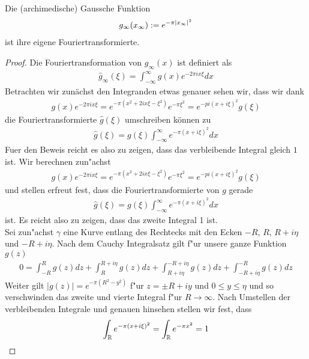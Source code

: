 \begin{satz}
	Die (archimedische) Gaussche Funktion
	\begin{align}
		g_\infty(x_\infty) := e^{-\pi |x_\infty|^2}
	\end{align}
	ist ihre eigene Fouriertransformierte.
\end{satz}

\begin{proof}
	Die Fouriertransformation von $g_\infty(x)$ ist definiert als
	\begin{align*}
		\hat{g}_\infty (\xi) = \int_{-\infty}^{\infty}{g(x)e^{-2\pi i x \xi}dx}
	\end{align*}
	Betrachten wir zunächst den Integranden etwas genauer sehen wir, dass wir dank
	\begin{align*}
		g(x)e^{-2\pi i x \xi} = e^{-\pi(x^2 +2 i x \xi - \xi ^2)}e^{-\pi \xi^2} = e^{-pi (x + i \xi)^2} g(\xi)
	\end{align*}
	die Fouriertransformierte $\hat{g} (\xi)$ umschreiben können zu
	\begin{align*}
		\hat{g}(\xi) = g(\xi) \int_{-\infty}^{\infty} {e^{-\pi(x+i\xi)^2}dx}
	\end{align*}
	Fuer den Beweis reicht es also zu zeigen, dass das verbleibende Integral gleich $1$ ist.
	Wir berechnen zun"achst
	\begin{align*}
		g(x)e^{-2\pi i x \xi} = e^{-\pi(x^2 +2 i x \xi - \xi ^2)}e^{-\pi \xi^2} = e^{-pi (x + i \xi)^2} g(\xi)
	\end{align*}
	und stellen erfreut fest, dass die Fouriertransformierte von $g$ gerade
	\begin{align*}
		\hat{g}(\xi) = g(\xi) \int_{-\infty}^{\infty} e^{-\pi(x+i\xi)^2}dx
	\end{align*}
	ist. Es reicht also zu zeigen, dass das zweite Integral 1 ist.\\
	Sei zun"achst $\gamma$ eine Kurve entlang des Rechtecks mit den Ecken $-R$, $R$, $R+i\eta$ und $-R+i\eta$. Nach dem Cauchy Integralsatz gilt f"ur unsere ganze Funktion $g(z)$
	\begin{align*}
		0 = \int_{-R}^{R} {g(z)dz} + \int_{R}^{R+i\eta} {g(z)dz}  + \int_{R+i\eta}^{-R+i\eta} {g(z)dz}  + \int_{-R+i\eta}^{-R} {g(z)dz} 
	\end{align*}
	Weiter gilt $|g(z)|=e^{-\pi (R^2 - y^2)}$ f"ur $z=\pm R + i y$ und $0\leq y \leq \eta$ und so verschwinden das zweite und vierte Integral f"ur $R\rightarrow \infty$. Nach Umstellen der verbleibenden Integrale und genauen hinsehen stellen wir fest, dass
	\begin{align*}
		\int_{\mathbb{R}}{e^{-\pi (x + i\xi)^2}} = \int_{\mathbb{R}} {e^{-\pi x^2} = 1}
	\end{align*}
\end{proof}

